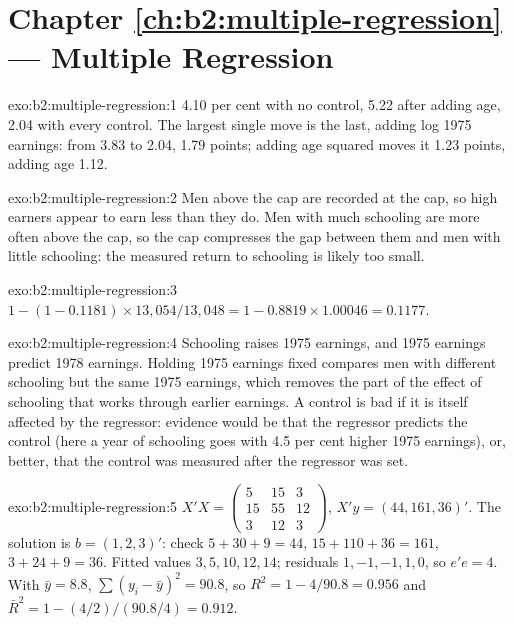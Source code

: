 \section*{Chapter \ref{ch:b2:multiple-regression} --- Multiple Regression}

\begin{solution}{exo:b2:multiple-regression:1}
4.10 per cent with no control, 5.22 after adding age, 2.04 with every control. The largest single move is the last,
adding log 1975 earnings: from 3.83 to 2.04, 1.79 points; adding age squared moves it 1.23 points, adding age 1.12.
\end{solution}

\begin{solution}{exo:b2:multiple-regression:2}
Men above the cap are recorded at the cap, so high earners appear to earn less than they do. Men with much schooling are
more often above the cap, so the cap compresses the gap between them and men with little schooling: the measured return to
schooling is likely too small.
\end{solution}

\begin{solution}{exo:b2:multiple-regression:3}
$1 - (1 - 0.1181) \times 13{,}054/13{,}048 = 1 - 0.8819 \times 1.00046 = 0.1177$.
\end{solution}

\begin{solution}{exo:b2:multiple-regression:4}
Schooling raises 1975 earnings, and 1975 earnings predict 1978 earnings. Holding 1975 earnings fixed compares men with
different schooling but the same 1975 earnings, which removes the part of the effect of schooling that works through
earlier earnings. A control is bad if it is itself affected by the regressor: evidence would be that the regressor
predicts the control (here a year of schooling goes with 4.5 per cent higher 1975 earnings), or, better, that the control
was measured after the regressor was set.
\end{solution}

\begin{solution}{exo:b2:multiple-regression:5}
$X'X = \begin{pmatrix}5 & 15 & 3\\ 15 & 55 & 12\\ 3 & 12 & 3\end{pmatrix}$, $X'y = (44, 161, 36)'$. The solution is
$b = (1, 2, 3)'$: check $5 + 30 + 9 = 44$, $15 + 110 + 36 = 161$, $3 + 24 + 9 = 36$. Fitted values $3, 5, 10, 12, 14$;
residuals $1, -1, -1, 1, 0$, so $e'e = 4$. With $\bar y = 8.8$, $\sum(y_i - \bar y)^2 = 90.8$, so $R^2 = 1 - 4/90.8 = 0.956$
and $\bar R^2 = 1 - (4/2)/(90.8/4) = 0.912$.
\end{solution}

